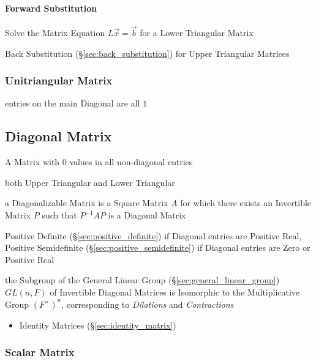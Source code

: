 \paragraph{Forward Substitution}\label{sec:forward_substitution}\hfill

Solve the Matrix Equation $L\vec{x} = \vec{b}$ for a Lower Triangular Matrix

\fist Back Substitution (\S\ref{sec:back_substitution}) for Upper Triangular
Matrices



\subsubsection{Unitriangular Matrix}\label{sec:unitriangular_matrix}

entries on the main Diagonal are all $1$



\subsection{Diagonal Matrix}\label{sec:diagonal_matrix}

A Matrix with $0$ values in all non-diagonal entries

both Upper Triangular and Lower Triangular

a Diagonalizable Matrix is a Square Matrix $A$ for which there exists an
Invertible Matrix $P$ such that $P^{-1}AP$ is a Diagonal Matrix

Positive Definite (\S\ref{sec:positive_definite}) if Diagonal entries are
Positive Real, Positive Semidefinite (\S\ref{sec:positive_semidefinite}) if
Diagonal entries are Zero or Positive Real

the Subgroup of the General Linear Group (\S\ref{sec:general_linear_group})
$GL(n,F)$ of Invertible Diagonal Matrices is Isomorphic to the Multiplicative
Group $(F^\times)^n$, corresponding to \emph{Dilations} and \emph{Contractions}

\begin{itemize}
  \item Identity Matrices (\S\ref{sec:identity_matrix})
\end{itemize}



\subsubsection{Scalar Matrix}\label{sec:scalar_matrix}

